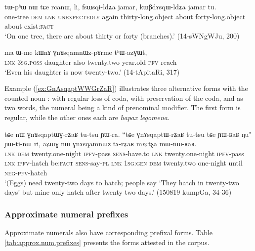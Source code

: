 \begin{exe}
\ex \label{ex:fsWsqildZa}
\gll tɯ-pʰɯ nɯ tɕe rcanɯ, li, fsɯsqi-ldʑa jamar, kɯβdɤsqɯ-ldʑa jamar tu. \\
one-tree \textsc{dem} \textsc{lnk} \textsc{unexpectedly} again thirty-long.object about forty-long.object about exist:\textsc{fact} \\
\glt `On one tree, there are about thirty or forty (branches).'   (14-sWNgWJu, 200)
\end{exe}

\begin{exe}
\ex \label{ex:GnAsqamnWzpArme}
\gll  ma ɯ-me kɯnɤ ɣnɤsqamnɯz-pɤrme tʰɯ-azɣɯt, \\
\textsc{lnk} \textsc{3sg}.\textsc{poss}-daughter also twenty.two-year.old \textsc{pfv}-reach \\
\glt `Even his daughter is now twenty-two.' (14-tApitaRi, 317)
\end{exe}

Example (\ref{ex:GnAsqaptWWGrZaR}) illustrates three alternative forms with the counted noun :  with regular loss of coda,  with preservation of the coda,   and   as two words, the numeral being a kind of prenominal modifier. The first form is regular, while the other ones each are \textit{hapax legomena}.

\begin{exe}
\ex \label{ex:GnAsqaptWWGrZaR}
\gll  tɕe nɯ ɣnɤsqaptɯɣ-rʑaʁ tu-tsu ɲɯ-ra. ``tɕe ɣnɤsqaptɯ-rʑaʁ tu-tsu tɕe ɲɯ-ʁaʁ ŋu" ɲɯ-ti-nɯ ri, aʑɯɣ nɯ ɣnɤsqamnɯz tɤ-rʑaʁ mɤɕtʂa mɯ-nɯ-ʁaʁ. \\
\textsc{lnk} \textsc{dem} twenty.one-night \textsc{ipfv}-pass \textsc{sens}-have.to  
\textsc{lnk}  twenty.one-night \textsc{ipfv}-pass  \textsc{lnk} \textsc{ipfv}-hatch be:\textsc{fact} \textsc{sens}-say-\textsc{pl} \textsc{lnk} \textsc{1sg}:\textsc{gen} \textsc{dem} twenty.two one-night until \textsc{neg}-\textsc{pfv}-hatch \\
\glt `(Eggs) need twenty-two days to hatch; people say `They hatch in twenty-two days' but mine only hatch after twenty two days.' (150819 kumpGa, 34-36)
\end{exe}


\subsubsection{Approximate numeral prefixes} \label{sec:approximate.numeral.prefixes}
Approximate numerals also have corresponding prefixal forms. Table \ref{tab:approx.num.prefixes} presents the forms attested in the corpus.

